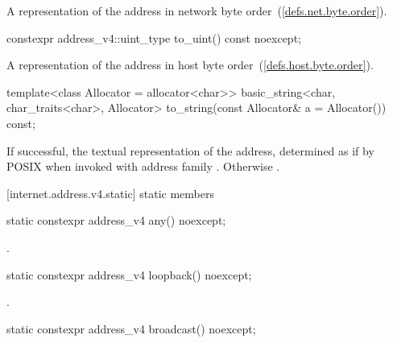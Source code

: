 \begin{itemdescr}
\pnum
\returns A representation of the address in network byte order~(\ref{defs.net.byte.order}).
\end{itemdescr}

%
\begin{itemdecl}
constexpr address_v4::uint_type to_uint() const noexcept;
\end{itemdecl}

\begin{itemdescr}
\pnum
\returns A representation of the address in host byte order~(\ref{defs.host.byte.order}).
\end{itemdescr}

%
\begin{itemdecl}
template<class Allocator = allocator<char>>
  basic_string<char, char_traits<char>, Allocator>
    to_string(const Allocator& a = Allocator()) const;
\end{itemdecl}

\begin{itemdescr}
\pnum
\returns If successful, the textual representation of the address, determined as if by POSIX  when invoked with address family . Otherwise .
\end{itemdescr}



[internet.address.v4.static]{ static members}

%
\begin{itemdecl}
static constexpr address_v4 any() noexcept;
\end{itemdecl}

\begin{itemdescr}
\pnum
\returns {}.
\end{itemdescr}

%
\begin{itemdecl}
static constexpr address_v4 loopback() noexcept;
\end{itemdecl}

\begin{itemdescr}
\pnum
\returns {}.
\end{itemdescr}

%
\begin{itemdecl}
static constexpr address_v4 broadcast() noexcept;
\end{itemdecl}


